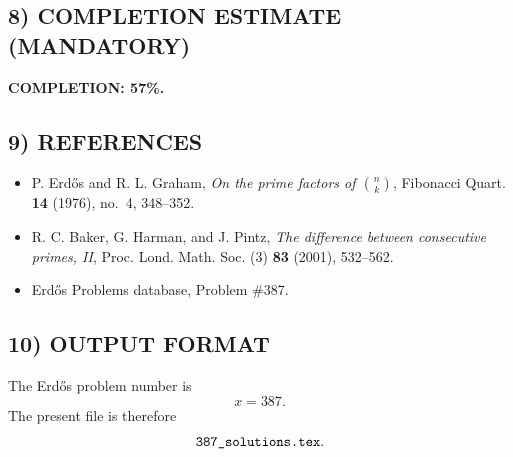 \subsection*{8) COMPLETION ESTIMATE (MANDATORY)}

\noindent\textbf{COMPLETION: 57\%.}

\subsection*{9) REFERENCES}

\begin{itemize}
\item P. Erd\H{o}s and R. L. Graham, \emph{On the prime factors of \(\binom{n}{k}\)}, Fibonacci Quart. \textbf{14} (1976), no.~4, 348--352.
\item R. C. Baker, G. Harman, and J. Pintz, \emph{The difference between consecutive primes, II}, Proc. Lond. Math. Soc. (3) \textbf{83} (2001), 532--562.
\item Erd\H{o}s Problems database, Problem \#387.
\end{itemize}

\subsection*{10) OUTPUT FORMAT}

The Erd\H{o}s problem number is
\[
x=387.
\]
The present file is therefore
\[
\hbox{\tt 387\_solutions.tex}.
\]
